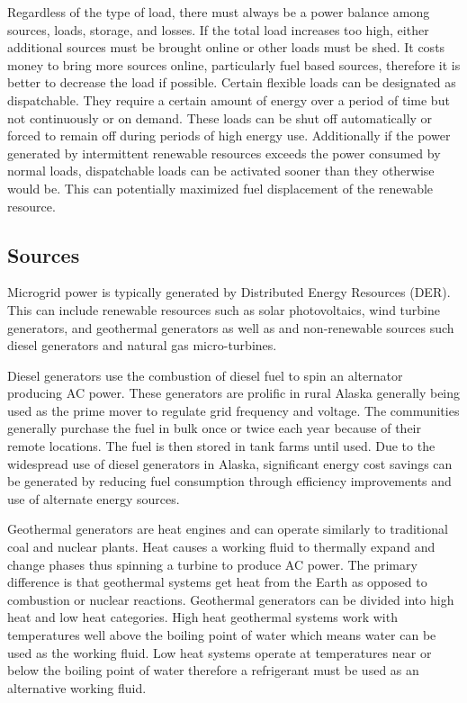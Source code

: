 Regardless of the type of load, there must always be a power balance among sources, loads, storage, and losses. If the total load increases too high, either additional sources must be brought online or other loads must be shed. It costs money to bring more sources online, particularly fuel based sources, therefore it is better to decrease the load if possible. Certain flexible loads can be designated as dispatchable. They require a certain amount of energy over a period of time but not continuously or on demand. These loads can be shut off automatically or forced to remain off during periods of high energy use. Additionally if the power generated by intermittent renewable resources exceeds the power consumed by normal loads, dispatchable loads can be activated sooner than they otherwise would be. This can potentially maximized fuel displacement of the renewable resource.  

\subsection{Sources}
Microgrid power is typically generated by Distributed Energy Resources (DER). This can include renewable resources such as solar photovoltaics, wind turbine generators, and geothermal generators as well as and non\--re\-new\-able sources such diesel generators and natural gas micro-turbines. 

Diesel generators use the combustion of diesel fuel to spin an alternator producing AC power. These generators are prolific in rural Alaska generally being used as the prime mover to regulate grid frequency and voltage. The communities  generally purchase the fuel in bulk once or twice each year because of their remote locations. The fuel is then stored in tank farms until used.
Due to the widespread use of diesel generators in Alaska, significant energy cost savings can be generated by reducing fuel consumption through efficiency improvements and use of alternate energy sources. 

Geothermal generators are heat engines and can operate similarly to traditional coal and nuclear plants. Heat causes a working fluid to thermally expand and change phases thus spinning a turbine to produce AC power. The primary difference is that geothermal systems get heat from the Earth as opposed to combustion or nuclear reactions. Geothermal generators can be divided into high heat and low heat categories. High heat geothermal systems work with temperatures well above the boiling point of water which means water can be used as the working fluid. Low heat systems operate at temperatures near or below the boiling point of water therefore a refrigerant must be used as an alternative working fluid. 


